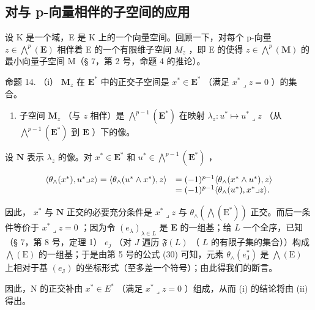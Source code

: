 \subsection{对与 p-向量相伴的子空间的应用}

设 K 是一个域，E 是 K 上的一个向量空间。回顾一下，对每个 p-向量 \(z \in \bigwedge^{p}(\mathbf{E})\) 相伴着 E 的一个有限维子空间 \(M_{z}\) ，即 E 的使得 \(z \in \bigwedge^{p}(\mathbf{M})\) 的最小向量子空间 M（§ 7，第 2 号，命题 4 的推论）。

命题 14. （i） \(\mathbf{M}_z\) 在 \(\mathbf{E}^*\) 中的正交子空间是 \(x^{*}\in \mathbf{E}^{*}\) （满足 \(x^{*}\lrcorner z = 0\) ）的集合。

\begin{enumerate}
\def\labelenumi{(\roman{enumi})}
\setcounter{enumi}{1}
\tightlist
\item
  子空间 \(\mathbf{M}_z\) （与 \(z\) 相伴）是 \(\bigwedge^{p-1}(\mathbf{E}^*)\) 在映射 \(\lambda_z: u^* \mapsto u^* \lrcorner z\) （从 \(\bigwedge^{p-1}(\mathbf{E}^*)\) 到 \(\mathbf{E}\) ）下的像。
\end{enumerate}

设 \(\mathbf{N}\) 表示 \(\lambda_z\) 的像。对 \(x^* \in \mathbf{E}^*\) 和 \(u^* \in \bigwedge^{p-1}(\mathbf{E}^*)\) ，

\[
\begin{array}{r l} \langle \theta_ {\wedge} (x ^ {*}), u ^ {*} \lrcorner z \rangle = \langle \theta_ {\wedge} (u ^ {*} \wedge x ^ {*}), z \rangle & = (- 1) ^ {p - 1} \langle \theta_ {\wedge} (x ^ {*} \wedge u ^ {*}), z \rangle \\ & = (- 1) ^ {p - 1} \langle \theta_ {\wedge} (u ^ {*}), x ^ {*} \lrcorner z \rangle . \end{array}
\]

因此， \(x^*\) 与 \(\mathbf{N}\) 正交的必要充分条件是 \(x^* \lrcorner z\) 与 \(\theta_\wedge (\bigwedge (\mathrm{E}^*))\) 正交。而后一条件等价于 \(x^* \lrcorner z = 0\) ；因为令 \((e_\lambda)_{\lambda \in L}\) 是 \(\mathbf{E}\) 的一组基；给 \(L\) 一个全序，已知（§ 7，第 8 号，定理 1） \(e_j\) （对 \(J\) 遍历 \(\mathfrak{F}(L)\) （ \(L\) 的有限子集的集合））构成 \(\bigwedge (\mathrm{E})\) 的一组基；于是由第 5 号的公式 (30) 可知，元素 \(\theta_{\wedge}(e_{\mathrm{J}}^{*})\) 是 \(\bigwedge(\mathrm{E})\) 上相对于基 \((e_{\mathrm{J}})\) 的坐标形式（至多差一个符号）；由此得我们的断言。

因此，N 的正交补由 \(x^{*} \in E^{*}\) （满足 \(x^{*} \lrcorner z = 0\) ）组成，从而 (i) 的结论将由 (ii) 得出。

